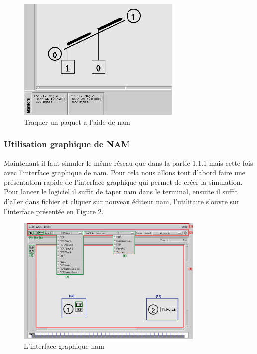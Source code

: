 \documentclass[11pt]{article}
\begin{document}
\begin{figure}[H]
	\begin{center}
		\includegraphics[width=0.7\textwidth]{assets/tp1/TraquerPaquet.png}
	\end{center}
	\caption{Traquer un paquet a l'aide de nam}
	\label{traquePaquet}
\end{figure}


\subsubsection{Utilisation graphique de NAM}

Maintenant il faut simuler le même réseau que dans la partie 1.1.1 mais cette fois avec l’interface graphique de nam. Pour cela nous allons tout d'abord faire une présentation rapide de l'interface graphique qui permet de créer la simulation. Pour lancer le logiciel il suffit de taper nam dans le terminal, ensuite il suffit d'aller dans fichier et cliquer sur nouveau éditeur nam,  l'utilitaire s'ouvre sur l'interface présentée en Figure \ref{namExplcation}.

\begin{figure}[H]
	\begin{center}
		\includegraphics[width=0.8\textwidth]{assets/tp1/explicationNam.png}
	\end{center}
	\caption{L'interface graphique nam}
	\label{namExplcation}
\end{figure}
\end{document}
